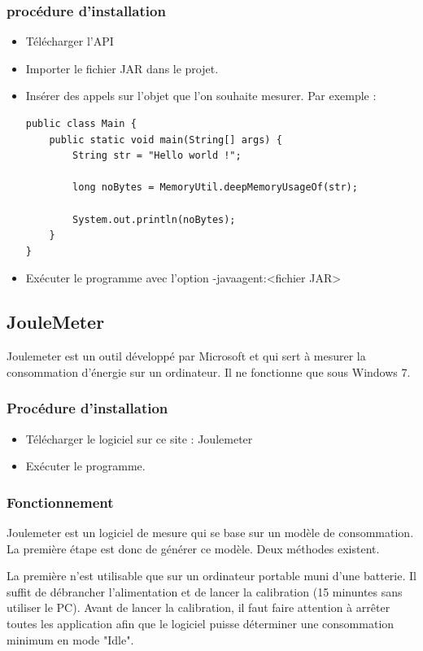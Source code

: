 \documentclass[a4paper, 11pt]{report}
\begin{document}
\subsubsection{procédure d'installation}
\begin{itemize}
	\item Télécharger l’API
	\item Importer le fichier JAR dans le projet.
	\item Insérer des appels sur l’objet que l’on souhaite mesurer. Par exemple :
\begin{verbatim}
public class Main {
	public static void main(String[] args) {
		String str = "Hello world !";
		
		long noBytes = MemoryUtil.deepMemoryUsageOf(str);
		
		System.out.println(noBytes);
	}
}
\end{verbatim}
	\item Exécuter le programme avec l’option -javaagent:<fichier JAR>
\end{itemize}

\subsection{JouleMeter}
Joulemeter est un outil développé par Microsoft et qui sert à mesurer la consommation d’énergie sur un ordinateur. Il ne fonctionne que sous Windows 7.

\subsubsection{Procédure d'installation}
\begin{itemize}
	\item Télécharger le logiciel sur ce site : Joulemeter
	\item Exécuter le programme.
\end{itemize}

\subsubsection{Fonctionnement}
Joulemeter est un logiciel de mesure qui se base sur un modèle de consommation. La première étape est donc de générer ce modèle. Deux méthodes existent.

La première n’est utilisable que sur un ordinateur portable muni d’une batterie. Il suffit de débrancher l’alimentation et de lancer la calibration (15 minuntes sans utiliser le PC). Avant de lancer la calibration, il faut faire attention à arrêter toutes les application afin que le logiciel puisse déterminer une consommation minimum en mode "Idle".
\end{document}

